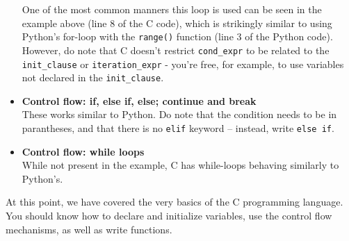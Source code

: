 \begin{itemize}
    One of the most common manners this loop is used can be seen in the example above (line 8 of the C code), which is strikingly similar to using Python's for-loop with the \verb|range()| function (line 3 of the Python code). However, do note that C doesn't restrict \verb|cond_expr| to be related to the \verb|init_clause| or \verb|iteration_expr| - you're free, for example, to use variables not declared in the \verb|init_clause|.

    \item \textbf{Control flow: if, else if, else; continue and break} \\
    These works similar to Python. Do note that the condition needs to be in parantheses, and that there is no \verb|elif| keyword -- instead, write \verb|else if|.
    
    \item \textbf{Control flow: while loops}\\
    While not present in the example, C has while-loops behaving similarly to Python's. 
\end{itemize}

At this point, we have covered the very basics of the C programming language. You should know how to declare and initialize variables, use the control flow mechanisms, as well as write functions. 



